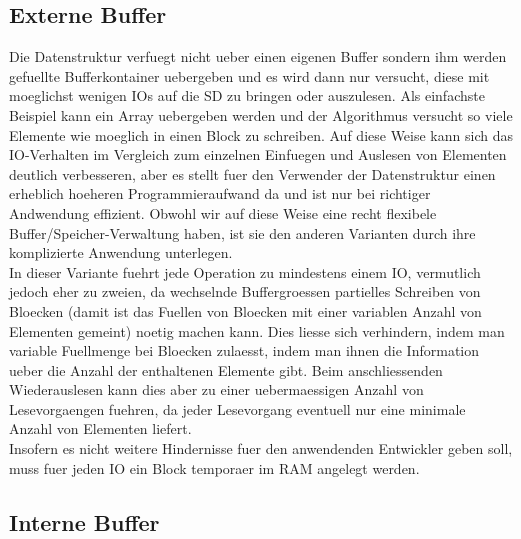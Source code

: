 \documentclass[10pt,a4paper]{article}
\begin{document}
\subsection{Externe Buffer}
Die Datenstruktur verfuegt nicht ueber einen eigenen Buffer sondern ihm werden gefuellte Bufferkontainer uebergeben und es wird dann nur versucht, diese mit moeglichst wenigen IOs auf die SD zu bringen oder auszulesen. Als einfachste Beispiel kann ein Array uebergeben werden und der Algorithmus versucht so viele Elemente wie moeglich in einen Block zu schreiben. Auf diese Weise kann sich das IO-Verhalten im Vergleich zum einzelnen Einfuegen und Auslesen von Elementen deutlich verbesseren, aber es stellt fuer den Verwender der Datenstruktur einen erheblich hoeheren Programmieraufwand da und ist nur bei richtiger Andwendung effizient. Obwohl wir auf diese Weise eine recht flexibele Buffer/Speicher-Verwaltung haben, ist sie den anderen Varianten durch ihre komplizierte Anwendung unterlegen.\\
In dieser Variante fuehrt jede Operation zu mindestens einem IO, vermutlich jedoch eher zu zweien, da wechselnde Buffergroessen partielles Schreiben von Bloecken (damit ist das Fuellen von Bloecken mit einer variablen Anzahl von Elementen gemeint) noetig machen kann. Dies liesse sich verhindern, indem man variable Fuellmenge bei Bloecken zulaesst, indem man ihnen die Information ueber die Anzahl der enthaltenen Elemente gibt. Beim anschliessenden Wiederauslesen kann dies aber zu einer uebermaessigen Anzahl von Lesevorgaengen fuehren, da jeder Lesevorgang eventuell nur eine minimale Anzahl von Elementen liefert.\\
Insofern es nicht weitere Hindernisse fuer den anwendenden Entwickler geben soll, muss fuer jeden IO ein Block temporaer im RAM angelegt werden.
\subsection{Interne Buffer}
\end{document}
